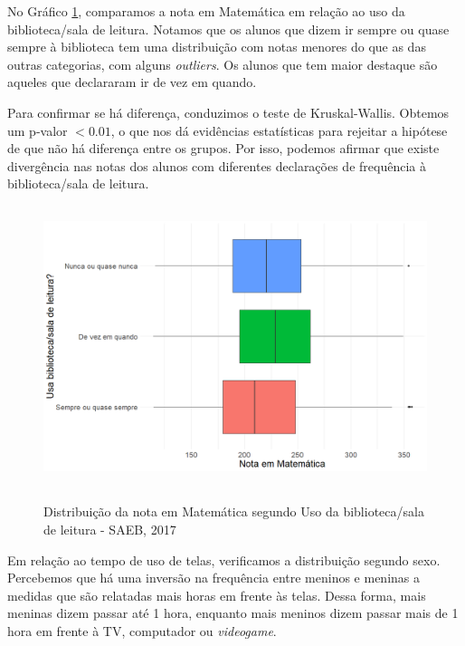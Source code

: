 \documentclass[a4paper, 12pt]{article} %
\begin{document}
No Gráfico \ref{fig3}, comparamos a nota em Matemática em relação ao uso da biblioteca/sala de leitura. Notamos que os alunos que dizem ir sempre ou quase sempre à biblioteca tem uma distribuição com notas menores do que as das outras categorias, com alguns \textit{outliers}. Os alunos que tem maior destaque são aqueles que declararam ir de vez em quando. 

Para confirmar se há diferença, conduzimos o teste de Kruskal-Wallis. Obtemos um p-valor $< 0.01$, o que nos dá evidências estatísticas para rejeitar a hipótese de que não há diferença entre os grupos. Por isso, podemos afirmar que existe divergência nas notas dos alunos com diferentes declarações de frequência à biblioteca/sala de leitura.

\begin{figure}[!ht]
\vspace{-0.25cm}
\caption{Distribuição da nota em Matemática segundo Uso da biblioteca/sala de leitura - SAEB, 2017}
\centering
\includegraphics[height=8.2cm,width=12.7cm]{figuras/boxplot_nota_biblioteca.png}
\vspace{-0.2cm}
\label{fig3}
\\ 
\end{figure}

Em relação ao tempo de uso de telas, verificamos a distribuição segundo sexo. Percebemos que há uma inversão na frequência entre meninos e meninas a medidas que são relatadas mais horas em frente às telas. Dessa forma, mais meninas dizem passar até 1 hora, enquanto mais meninos dizem passar mais de 1 hora em frente à TV, computador ou \textit{videogame}. 
\end{document}
